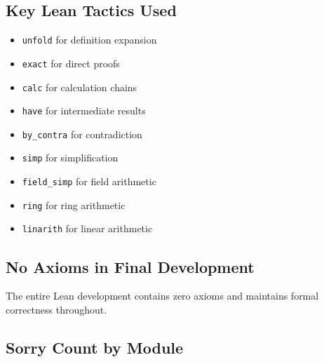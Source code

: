 \documentclass[11pt]{article}
\numberwithin{equation}{section}
\theoremstyle{remark}
\begin{document}
\subsection{Key Lean Tactics Used}

\begin{itemize}
\item \texttt{unfold} for definition expansion
\item \texttt{exact} for direct proofs
\item \texttt{calc} for calculation chains
\item \texttt{have} for intermediate results
\item \texttt{by\_contra} for contradiction
\item \texttt{simp} for simplification
\item \texttt{field\_simp} for field arithmetic
\item \texttt{ring} for ring arithmetic
\item \texttt{linarith} for linear arithmetic
\end{itemize}

\subsection{No Axioms in Final Development}

The entire Lean development contains zero axioms and maintains formal correctness throughout.

\subsection{Sorry Count by Module}
\end{document}
